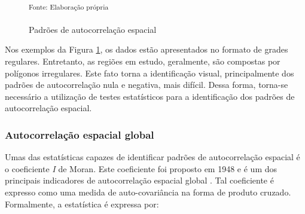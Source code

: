 \documentclass[12pt,a4paper]{article}
\begin{document}
\begin{figure}[H]
	\centering
	\caption{Padrões de autocorrelação espacial}
	\small
	\hspace{0.2cm}
	\hspace{0.2cm}
	\\
	\parbox{\dimexpr\linewidth-8.3cm}{\raggedright
    \strut \textsuperscript{Fonte: Elaboração própria}\strut}
	\label{autocorrelacao_2}
\end{figure}
	
Nos exemplos da Figura \ref{autocorrelacao_2}, os dados estão apresentados no formato de grades regulares. Entretanto, as regiões em estudo, geralmente, são compostas por polígonos irregulares. Este fato torna a identificação visual, principalmente dos padrões de autocorrelação nula e negativa, mais difícil. Dessa forma, torna-se necessário a utilização de testes estatísticos para a identificação dos padrões de autocorrelação espacial. 
	
\subsubsection{Autocorrelação espacial global}

Umas das estatísticas capazes de identificar padrões de autocorrelação espacial é o coeficiente \textit{I} de Moran. Este coeficiente foi proposto em 1948 e é um dos principais indicadores de autocorrelação espacial global \cite{almeida12_g}. Tal coeficiente é expresso como uma medida de auto-covariância na forma de produto cruzado. Formalmente, a estatística é expressa por:
	
\end{document}
